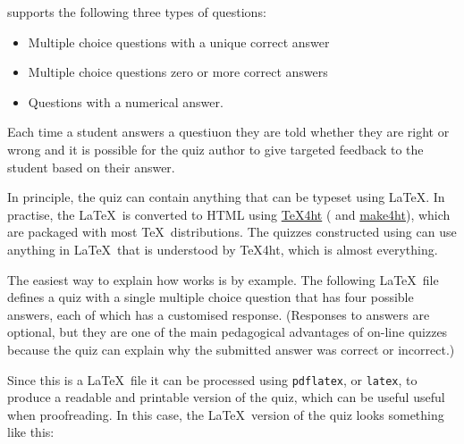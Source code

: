 \documentclass[svgnames]{article}
\begin{document}
    \MathQuiz supports the following three types of questions:
    \begin{itemize}
      \item Multiple choice questions with a unique correct answer
      \item Multiple choice questions zero or more correct answers
      \item Questions with a numerical answer.
    \end{itemize}
    Each time a student answers a questiuon they are told whether they
    are right or wrong and it is possible for the quiz author to give
    targeted feedback to the student based on their answer.

    In principle, the quiz can contain anything that can be typeset
    using \LaTeX.  In practise, the \LaTeX\ is converted to HTML using
    \href{https://www.tug.org/applications/tex4ht/mn.html}{\TeX 4ht} (
    and \href{https://github.com/michal-h21/make4ht}{make4ht}), which are
    packaged with most \TeX\ distributions. The quizzes constructed
    using \MathQuiz can use anything in \LaTeX\ that is understood by
    \TeX 4ht, which is almost everything.

    The easiest way to explain how \MathQuiz works is by example. The
    following \LaTeX\ file defines a quiz with a single multiple choice
    question that has four possible answers, each of which has a
    customised response.  (Responses to answers are optional, but they
    are one of the main pedagogical advantages of on-line quizzes because the
    quiz can explain why the submitted answer was correct or incorrect.)

    

    Since this is a \LaTeX\ file it can be processed using
    \texttt{pdflatex}, or \texttt{latex}, to produce a readable and
    printable version of the quiz, which can be useful useful when
    proofreading. In this case, the \LaTeX\ version of the quiz looks
    something like this:

    \begin{center}
    \end{center}
\end{document}
